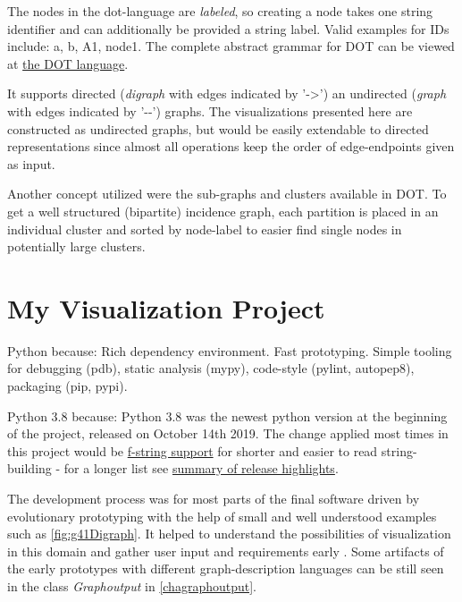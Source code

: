 \documentclass[a4paper, 12pt]{scrartcl}
\begin{document}

The nodes in the dot-language are \emph{labeled}, so creating a node takes one string identifier and
can additionally be provided a string label. Valid examples for IDs include: a, b, A1, node1.
The complete abstract grammar for DOT can be viewed at \href{https://graphviz.gitlab.io/_pages/doc/info/lang.html}{the DOT language}.

It supports directed (\textit{digraph} with edges indicated by '->') an undirected (\textit{graph} with edges indicated by '-{}-') graphs.
The visualizations presented here are constructed as undirected graphs, but would be easily extendable to directed representations since almost all operations keep the order of edge-endpoints given as input.

Another concept utilized were the sub-graphs and clusters available in DOT.
To get a well structured (bipartite) incidence graph, each partition is placed in an individual cluster
and sorted by node-label to easier find single nodes in potentially large clusters.


\newpage
\section{My Visualization Project}


Python because: Rich dependency environment. Fast prototyping. Simple tooling for debugging (pdb), static analysis (mypy), code-style (pylint, autopep8), packaging (pip, pypi).

Python 3.8 because: Python 3.8 was the newest python version at the beginning of the project, released on October 14th 2019. The change applied most times in this project would be \href{https://docs.python.org/3/whatsnew/3.8.html#f-strings-support-for-self-documenting-expressions-and-debugging}{f-string support} for shorter and easier to read string-building - for a longer list see \href{https://docs.python.org/3/whatsnew/3.8.html}{summary of release highlights}.

The development process was for most parts of the final software driven by evolutionary prototyping with the help of small and well understood examples such as \ref{fig:g41Digraph}. It helped to understand the possibilities of visualization in this domain and gather user input and requirements early \cite{rapidPrototypingOvermyer}. Some artifacts of the early prototypes with different graph-description languages can be still seen in the class \textit{Graphoutput} in \ref{chagraphoutput}.
\end{document}
